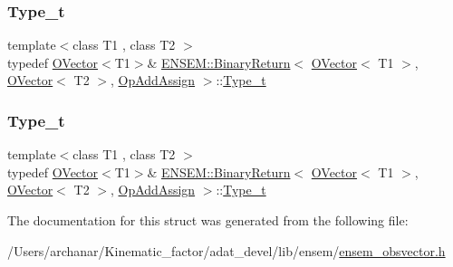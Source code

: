 \subsubsection{\texorpdfstring{Type\_t}{Type\_t}\hspace{0.1cm}{\footnotesize\ttfamily [1/2]}}
{\footnotesize\ttfamily template$<$class T1 , class T2 $>$ \\
typedef \mbox{\hyperlink{classENSEM_1_1OVector}{O\+Vector}}$<$T1$>$\& \mbox{\hyperlink{structENSEM_1_1BinaryReturn}{E\+N\+S\+E\+M\+::\+Binary\+Return}}$<$ \mbox{\hyperlink{classENSEM_1_1OVector}{O\+Vector}}$<$ T1 $>$, \mbox{\hyperlink{classENSEM_1_1OVector}{O\+Vector}}$<$ T2 $>$, \mbox{\hyperlink{structENSEM_1_1OpAddAssign}{Op\+Add\+Assign}} $>$\+::\mbox{\hyperlink{structENSEM_1_1BinaryReturn_3_01OVector_3_01T1_01_4_00_01OVector_3_01T2_01_4_00_01OpAddAssign_01_4_a6a0e2c2cf466c9c8da44fef6943d3385}{Type\+\_\+t}}}

\mbox{\label{structENSEM_1_1BinaryReturn_3_01OVector_3_01T1_01_4_00_01OVector_3_01T2_01_4_00_01OpAddAssign_01_4_a6a0e2c2cf466c9c8da44fef6943d3385}} 
\subsubsection{\texorpdfstring{Type\_t}{Type\_t}\hspace{0.1cm}{\footnotesize\ttfamily [2/2]}}
{\footnotesize\ttfamily template$<$class T1 , class T2 $>$ \\
typedef \mbox{\hyperlink{classENSEM_1_1OVector}{O\+Vector}}$<$T1$>$\& \mbox{\hyperlink{structENSEM_1_1BinaryReturn}{E\+N\+S\+E\+M\+::\+Binary\+Return}}$<$ \mbox{\hyperlink{classENSEM_1_1OVector}{O\+Vector}}$<$ T1 $>$, \mbox{\hyperlink{classENSEM_1_1OVector}{O\+Vector}}$<$ T2 $>$, \mbox{\hyperlink{structENSEM_1_1OpAddAssign}{Op\+Add\+Assign}} $>$\+::\mbox{\hyperlink{structENSEM_1_1BinaryReturn_3_01OVector_3_01T1_01_4_00_01OVector_3_01T2_01_4_00_01OpAddAssign_01_4_a6a0e2c2cf466c9c8da44fef6943d3385}{Type\+\_\+t}}}



The documentation for this struct was generated from the following file\+:\begin{DoxyCompactItemize}
\item 
/\+Users/archanar/\+Kinematic\+\_\+factor/adat\+\_\+devel/lib/ensem/\mbox{\hyperlink{lib_2ensem_2ensem__obsvector_8h}{ensem\+\_\+obsvector.\+h}}\end{DoxyCompactItemize}
